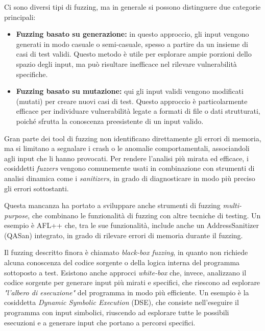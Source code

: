 \smallskip
Ci sono diversi tipi di fuzzing, ma in generale si possono distinguere due categorie
principali:

\begin{itemize}
  \item \textbf{Fuzzing basato su generazione:} in questo approccio, gli input vengono
    generati in modo casuale o semi-casuale, spesso a partire da un insieme di
    casi di test validi. Questo metodo è utile per esplorare ampie porzioni dello
    spazio degli input, ma può risultare inefficace nel rilevare vulnerabilità
    specifiche.

  \item \textbf{Fuzzing basato su mutazione:} qui gli input validi vengono
    modificati (mutati) per creare nuovi casi di test. Questo approccio è particolarmente
    efficace per individuare vulnerabilità legate a formati di file o dati strutturati,
    poiché sfrutta la conoscenza preesistente di un input valido.
\end{itemize}

Gran parte dei tool di fuzzing non identificano direttamente gli errori di
memoria, ma si limitano a segnalare i crash o le anomalie comportamentali,
associandoli agli input che li hanno provocati. Per rendere l'analisi più mirata
ed efficace, i cosiddetti \textit{fuzzers} vengono comunemente usati in combinazione
con strumenti di analisi dinamica come i \textit{sanitizers}, in grado di diagnosticare
in modo più preciso gli errori sottostanti.

Questa mancanza ha portato a sviluppare anche strumenti di fuzzing \textit{multi-purpose},
che combinano le funzionalità di fuzzing con altre tecniche di testing. Un
esempio è AFL++\cite{afl_plus_plus} che, tra le sue funzionalità, include anche un
AddressSanitizer (QASan\cite{qasan}) integrato, in grado di rilevare errori di memoria
durante il fuzzing.

Il fuzzing descritto finora è chiamato \textit{black-box fuzzing}, in quanto non
richiede alcuna conoscenza del codice sorgente o della logica interna del programma
sottoposto a test. Esistono anche approcci \textit{white-box} che, invece, analizzano
il codice sorgente per generare input più mirati e specifici, che riescono ad
esplorare \textit{"l'albero di esecuzione"} del programma in modo più efficiente.
Un esempio è la cosiddetta \textit{Dynamic Symbolic Execution} (DSE), che
consiste nell'eseguire il programma con input simbolici, riuscendo ad esplorare tutte
le possibili esecuzioni e a generare input che portano a percorsi specifici.


